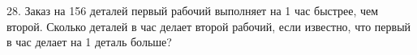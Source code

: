 28. Заказ на 156 деталей первый рабочий выполняет на 1 час быстрее, чем второй. Сколько деталей в час делает второй рабочий, если известно, что первый в час делает на 1 деталь больше?\\
